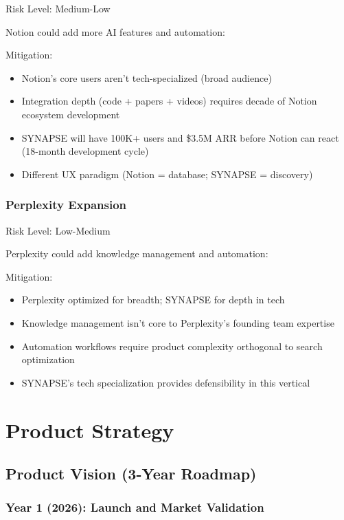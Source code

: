 \documentclass{report}
\begin{document}
Risk Level: Medium-Low

Notion could add more AI features and automation:

Mitigation:
\begin{itemize}
    \item Notion's core users aren't tech-specialized (broad audience)
    \item Integration depth (code + papers + videos) requires decade of Notion ecosystem development
    \item SYNAPSE will have 100K+ users and \$3.5M ARR before Notion can react (18-month development cycle)
    \item Different UX paradigm (Notion = database; SYNAPSE = discovery)
\end{itemize}

\subsection{Perplexity Expansion}

Risk Level: Low-Medium

Perplexity could add knowledge management and automation:

Mitigation:
\begin{itemize}
    \item Perplexity optimized for breadth; SYNAPSE for depth in tech
    \item Knowledge management isn't core to Perplexity's founding team expertise
    \item Automation workflows require product complexity orthogonal to search optimization
    \item SYNAPSE's tech specialization provides defensibility in this vertical
\end{itemize}

\newpage

\chapter{Product Strategy}

\section{Product Vision (3-Year Roadmap)}

\subsection{Year 1 (2026): Launch and Market Validation}
\end{document}

